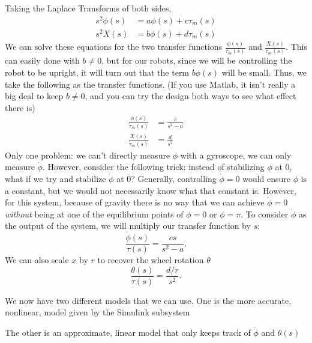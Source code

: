 Taking the Laplace Transforms of both sides,
\begin{align*}
s^2\phi(s) &=  a \phi(s) + c\tau_{m}(s)\\
s^{2}X(s) &= b\phi(s) + d\tau_{m}(s)
\end{align*}
We can solve these equations for the two transfer functions $\frac{\phi(s)}{\tau_{m}(s)}$ and $\frac{X(s)}{\tau_{m}(s)}$. This can easily done with $b\neq 0$, but for our robots, since we will be controlling the robot to be upright, it will turn out that the term $b\phi(s)$ will be small. Thus, we take the following as the transfer functions. (If you use Matlab, it isn't really a big deal to keep $b\neq 0$, and you can try the design both ways to see what effect there is)
\begin{align*}
\frac{\phi(s)}{\tau_{m}(s)} & = \frac{c}{s^{2} -a} \\
\frac{X(s)}{\tau_{m}(s)} & =\frac{d}{s^{2}}
\end{align*}
Only one problem: we can't directly measure $\phi$ with a gyroscope, we can only measure $\dot{\phi}$. However, consider the following trick: instead of stabilizing $\phi$ at 0, what if we try and stabilize $\dot{\phi}$ at 0? Generally, controlling $\dot{\phi}=0$ would ensure $\phi$ is a constant, but we would not necessarily know what that constant is. However, for this system, because of gravity there is no way that we can achieve $\dot{\phi}=0$ {\em without} being at one of the equilibrium points of $\phi=0$ or $\phi=\pi$.  To consider $\dot{\phi}$ as the output of the system,  we will multiply our transfer function by $s$:
\[
\frac{\dot{\phi}(s)}{\tau(s)} = \frac{cs}{s^{2} -a}.
\]
We can also scale $x$ by $r$ to recover the wheel rotation $\theta$
\[
\frac{\theta(s)}{\tau(s)} = \frac{d/r}{s^{2}}.
\]


We now have two different models that we can use. One is the more accurate, nonlinear, model given by the Simulink subsystem
\begin{center}
\end{center}
The other is an approximate, linear model that only keeps track of $\dot{\phi}$ and $\theta(s)$ 

